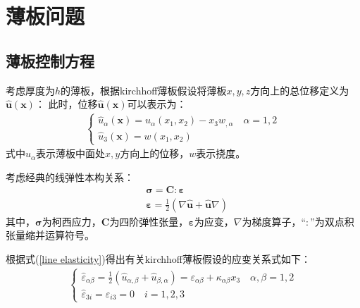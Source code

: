 \chapter{薄板问题}
\section{薄板控制方程}
考虑厚度为$h$的薄板，根据kirchhoff薄板假设将薄板$x,y,z$方向上的总位移定义为$\hat{\pmb{u}}(\pmb{x})$：
此时，位移$\hat{\pmb{u}}(\pmb{x})$可以表示为：
\begin{equation}
    \begin{split}
    \begin{cases}
        \hat{u}_{\alpha}(\pmb{x})=u_{\alpha}(x_1,x_2)-x_3w_{,\alpha}\quad \alpha=1,2\\
        \hat{u}_3(\pmb{x})=w(x_1,x_2)
    \end{cases}
    \end{split}
    \end{equation}
式中$u_{\alpha}$表示薄板中面处$x,y$方向上的位移，$w$表示挠度。\par
考虑经典的线弹性本构关系：
\begin{equation}\label{line elasticity}
\begin{split}
    &\pmb{\sigma}=\pmb{C}\pmb{:}\pmb{\varepsilon}\\
    &\pmb{\varepsilon}=\frac{1}{2}(\nabla\hat{\pmb{u}}+\hat{\pmb{u}}\nabla)
\end{split}
\end{equation}
其中，$\pmb{\sigma}$为柯西应力，$\pmb{C}$为四阶弹性张量，$\pmb{\varepsilon}$为应变，$\nabla$为梯度算子，$“\pmb{:}”$为双点积张量缩并运算符号。\par
根据式(\ref{line elasticity})得出有关kirchhoff薄板假设的应变关系式如下：
\begin{equation}\label{strain}
\begin{split}
\begin{cases}
    \hat{\varepsilon}_{\alpha\beta}=\frac{1}{2}(\hat{u}_{\alpha,\beta}+\hat{u}_{\beta,\alpha})=\varepsilon_{\alpha\beta}+\kappa_{\alpha\beta}x_3 \quad \alpha,\beta=1,2\\
    \hat{\varepsilon}_{3i}=\hat{\varepsilon}_{i3}=0 \quad i=1,2,3
\end{cases}
\end{split}
\end{equation}
